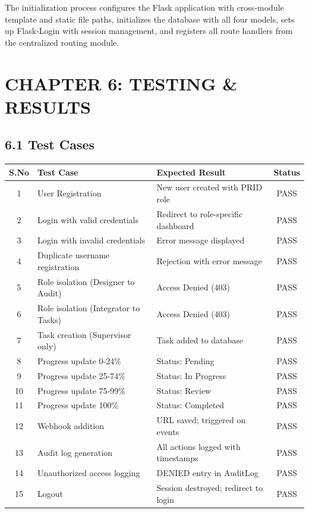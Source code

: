 ﻿\documentclass[12pt]{article}
\def\normaltext{\fontsize{12pt}{18pt}\color{secondary}}
\begin{document}
The initialization process configures the Flask application with cross-module template and static file paths, initializes the database with all four models, sets up Flask-Login with session management, and registers all route handlers from the centralized routing module.
\newpage

\section*{{\color{primary}CHAPTER 6: TESTING \& RESULTS}}
\normaltext

\subsection*{6.1 Test Cases}
\begin{center}
\begin{tabular}{|c|l|p{5cm}|c|}
\hline
\textbf{S.No} & \textbf{Test Case} & \textbf{Expected Result} & \textbf{Status} \\ \hline
1 & User Registration & New user created with PRID role & PASS \\ \hline
2 & Login with valid credentials & Redirect to role-specific dashboard & PASS \\ \hline
3 & Login with invalid credentials & Error message displayed & PASS \\ \hline
4 & Duplicate username registration & Rejection with error message & PASS \\ \hline
5 & Role isolation (Designer to Audit) & Access Denied (403) & PASS \\ \hline
6 & Role isolation (Integrator to Tasks) & Access Denied (403) & PASS \\ \hline
7 & Task creation (Supervisor only) & Task added to database & PASS \\ \hline
8 & Progress update 0-24\% & Status: Pending & PASS \\ \hline
9 & Progress update 25-74\% & Status: In Progress & PASS \\ \hline
10 & Progress update 75-99\% & Status: Review & PASS \\ \hline
11 & Progress update 100\% & Status: Completed & PASS \\ \hline
12 & Webhook addition & URL saved; triggered on events & PASS \\ \hline
13 & Audit log generation & All actions logged with timestamps & PASS \\ \hline
14 & Unauthorized access logging & DENIED entry in AuditLog & PASS \\ \hline
15 & Logout & Session destroyed; redirect to login & PASS \\ \hline
\end{tabular}
\end{center}
\end{document}
